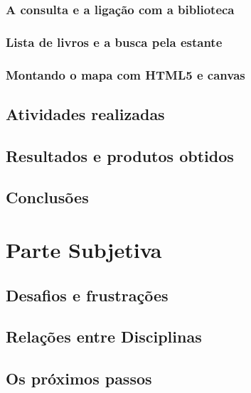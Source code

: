 \documentclass[a4paper,10pt]{article}
\begin{document}
	\subsubsection{A consulta e a ligação com a biblioteca}
	\subsubsection{Lista de livros e a busca pela estante}
	\subsubsection{Montando o mapa com HTML5 e canvas}
   \subsection{Atividades realizadas}
	
   \subsection{Resultados e produtos obtidos}
   \subsection{Conclusões}

   
  \section{Parte Subjetiva}
  \subsection{Desafios e frustrações}
  \subsection{Relações entre Disciplinas}
  \subsection{Os próximos passos}
  
   
  
\end{document}
